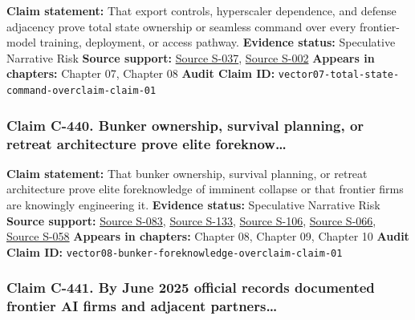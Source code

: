 \documentclass[
  american,
  11pt,
  letterpaper,
]{article}
\begin{document}
\textbf{Claim statement:} That export controls, hyperscaler dependence,
and defense adjacency prove total state ownership or seamless command
over every frontier-model training, deployment, or access pathway.
\textbf{Evidence status:} Speculative Narrative Risk \textbf{Source
support:}
\hyperref[source-s-037-guidance-regarding-enforcement-of-license-requirements-for-advanced-computing-items-for-entities-headquartered-in-country-group-d-5-and-macau]{Source
S-037},
\hyperref[source-s-002-amazon-and-anthropic-announce-strategic-collaboration-to-advance-generative-ai]{Source
S-002} \textbf{Appears in chapters:} Chapter 07, Chapter 08
\textbf{Audit Claim ID:}
\texttt{vector07-total-state-command-overclaim-claim-01}

\subsubsection{Claim C-440. Bunker ownership, survival planning, or
retreat architecture prove elite
foreknow\ldots{}}\label{claim-c-440-bunker-ownership-survival-planning-or-retreat-architecture-prove-elite-foreknow}

\textbf{Claim statement:} That bunker ownership, survival planning, or
retreat architecture prove elite foreknowledge of imminent collapse or
that frontier firms are knowingly engineering it. \textbf{Evidence
status:} Speculative Narrative Risk \textbf{Source support:}
\hyperref[source-s-083-sam-altman-s-manifest-destiny]{Source S-083},
\hyperref[source-s-133-inside-mark-zuckerbergs-top-secret-hawaii-compound]{Source
S-133},
\hyperref[source-s-106-mark-zuckerberg-downplays-his-5-000-square-foot-underground-bunker-in-hawaii-just-a-little-shelter]{Source
S-106},
\hyperref[source-s-066-why-silicon-valley-billionaires-are-prepping-for-the-apocalypse-in-new-zealand]{Source
S-066},
\hyperref[source-s-058-new-zealand-woos-the-wealthy-with-golden-visa-changes]{Source
S-058} \textbf{Appears in chapters:} Chapter 08, Chapter 09, Chapter 10
\textbf{Audit Claim ID:}
\texttt{vector08-bunker-foreknowledge-overclaim-claim-01}

\subsubsection{Claim C-441. By June 2025 official records documented
frontier AI firms and adjacent
partners\ldots{}}\label{claim-c-441-by-june-2025-official-records-documented-frontier-ai-firms-and-adjacent-partners}
\end{document}
